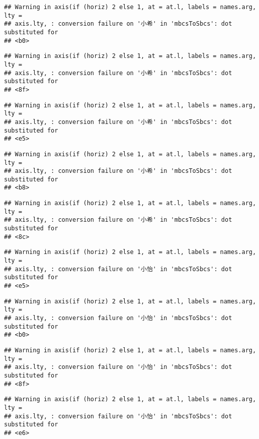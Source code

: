 \documentclass[
]{article}
\begin{document}
\begin{verbatim}
## Warning in axis(if (horiz) 2 else 1, at = at.l, labels = names.arg, lty =
## axis.lty, : conversion failure on '小希' in 'mbcsToSbcs': dot substituted for
## <b0>
\end{verbatim}

\begin{verbatim}
## Warning in axis(if (horiz) 2 else 1, at = at.l, labels = names.arg, lty =
## axis.lty, : conversion failure on '小希' in 'mbcsToSbcs': dot substituted for
## <8f>
\end{verbatim}

\begin{verbatim}
## Warning in axis(if (horiz) 2 else 1, at = at.l, labels = names.arg, lty =
## axis.lty, : conversion failure on '小希' in 'mbcsToSbcs': dot substituted for
## <e5>
\end{verbatim}

\begin{verbatim}
## Warning in axis(if (horiz) 2 else 1, at = at.l, labels = names.arg, lty =
## axis.lty, : conversion failure on '小希' in 'mbcsToSbcs': dot substituted for
## <b8>
\end{verbatim}

\begin{verbatim}
## Warning in axis(if (horiz) 2 else 1, at = at.l, labels = names.arg, lty =
## axis.lty, : conversion failure on '小希' in 'mbcsToSbcs': dot substituted for
## <8c>
\end{verbatim}

\begin{verbatim}
## Warning in axis(if (horiz) 2 else 1, at = at.l, labels = names.arg, lty =
## axis.lty, : conversion failure on '小怡' in 'mbcsToSbcs': dot substituted for
## <e5>
\end{verbatim}

\begin{verbatim}
## Warning in axis(if (horiz) 2 else 1, at = at.l, labels = names.arg, lty =
## axis.lty, : conversion failure on '小怡' in 'mbcsToSbcs': dot substituted for
## <b0>
\end{verbatim}

\begin{verbatim}
## Warning in axis(if (horiz) 2 else 1, at = at.l, labels = names.arg, lty =
## axis.lty, : conversion failure on '小怡' in 'mbcsToSbcs': dot substituted for
## <8f>
\end{verbatim}

\begin{verbatim}
## Warning in axis(if (horiz) 2 else 1, at = at.l, labels = names.arg, lty =
## axis.lty, : conversion failure on '小怡' in 'mbcsToSbcs': dot substituted for
## <e6>
\end{verbatim}
\end{document}
